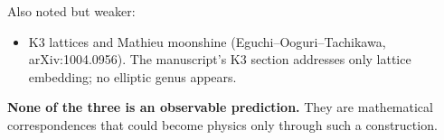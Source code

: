 \documentclass[10pt]{article}\usepackage[margin=0.8in]{geometry}\usepackage{amssymb,longtable,array,url,hyperref}\usepackage[T1]{fontenc}\usepackage{lmodern}\sloppy\usepackage{newunicodechar}\newunicodechar{η}{\ensuremath{\eta}}\newunicodechar{ω}{\ensuremath{\omega}}\newunicodechar{⁺}{\ensuremath{^{+}}}\newunicodechar{⁻}{\ensuremath{^{-}}}\newunicodechar{∏}{\ensuremath{\prod}}\newunicodechar{⁸}{\ensuremath{^{8}}}\newunicodechar{⁴}{\ensuremath{^{4}}}\newunicodechar{⁶}{\ensuremath{^{6}}}\newunicodechar{θ}{\ensuremath{\theta}}\newunicodechar{₇}{\ensuremath{_{7}}}\newunicodechar{₂}{\ensuremath{_{2}}}\newunicodechar{₁}{\ensuremath{_{1}}}\newunicodechar{⊕}{\ensuremath{\oplus}}
\begin{document}
Also noted but weaker:
\begin{itemize}
\item  K3 lattices and Mathieu moonshine (Eguchi--Ooguri--Tachikawa, arXiv:1004.0956). The manuscript's K3 section addresses only lattice embedding; no elliptic genus appears.
\end{itemize}

\textbf{None of the three is an observable prediction.} They are mathematical correspondences that could become physics only through such a construction.
\end{document}
